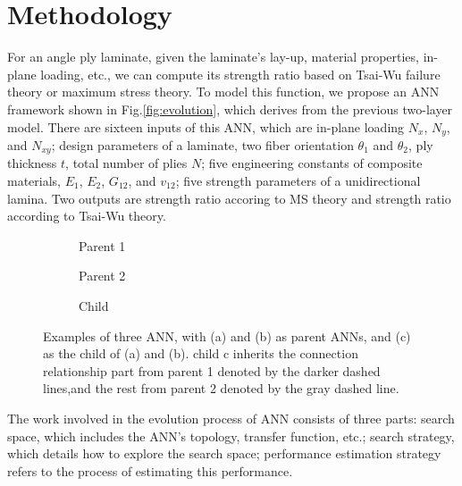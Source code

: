 \section{Methodology}
For an angle ply laminate, given the laminate's lay-up, material properties,
in-plane loading, etc., we can compute its strength ratio based on Tsai-Wu
failure theory or maximum stress theory. To model this function, we propose an
ANN framework shown in Fig.\ref{fig:evolution}, which derives from the previous
two-layer model. There are sixteen inputs of this ANN, which are in-plane
loading $N_x$, $N_y$, and $N_{xy}$; design parameters of a laminate, two 
fiber orientation $\theta_1$ and $\theta_2$, ply thickness $t$, total
number of plies $N$; 
five engineering constants of composite materials,
$E_1$, $E_2$, $G_{12}$, and $v_{12}$; five strength parameters of a
unidirectional lamina.  Two outputs are strength ratio accoring to MS theory
and strength ratio according to Tsai-Wu theory.


\begin{figure}[!tb]
	\centering
	\begin{subfigure}[b]{1.0\linewidth}
		\centering
		
		\caption{Parent 1}
	\end{subfigure}
	\newline
	\begin{subfigure}[b]{1.0\linewidth}
		\centering
		
		\caption{Parent 2}
	\end{subfigure}
	\newline
	\begin{subfigure}[b]{1.0\linewidth}
		\centering
		
		\caption{Child}
	\end{subfigure}
	\caption{Examples of three ANN, with (a) and (b) as parent ANNs, and (c) as
		the child of (a) and (b). child c inherits the connection relationship
		part from parent 1 denoted by the darker dashed lines,and the rest from
		parent 2 denoted by the gray dashed line.}
		\label{fig:anns}
\end{figure}


The work involved in the evolution process of ANN consists of three parts:
search space, which includes the ANN's topology, transfer function, etc.;
search strategy, which details how to explore the search space; performance
estimation strategy refers to the process of estimating this performance.

